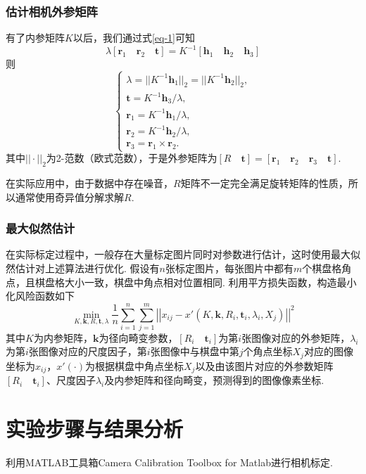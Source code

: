\documentclass[12pt, a4paper, oneside]{ctexart}
\numberwithin{equation}{section}  %
\def\bd{\boldsymbol}        %
\begin{document}
\subsubsection{估计相机外参矩阵}
有了内参矩阵$K$以后，我们通过式\ref{eq-1}可知
\begin{equation*}
    \lambda[\bd{r}_1\quad \bd{r}_2\quad \bd{t}] = K^{-1}[\bd{h}_1\quad \bd{h}_2\quad \bd{h}_3]
\end{equation*}
则
\begin{equation*}
    \begin{cases}
        \lambda = ||K^{-1}\bd{h}_1||_2 = ||K^{-1}\bd{h}_2||_2,\\
        \bd{t} = K^{-1}\bd{h}_3/\lambda,\\
        \bd{r}_1 = K^{-1}\bd{h}_1/\lambda,\\
        \bd{r}_2 = K^{-1}\bd{h}_2/\lambda,\\
        \bd{r}_3=\bd{r}_1\times \bd{r}_2.
    \end{cases}
\end{equation*}
其中$||\cdot||_2$为2-范数（欧式范数），于是外参矩阵为$[R\quad \bd{t}] = [\bd{r}_1\quad \bd{r}_2\quad \bd{r}_3\quad \bd{t}]$.

在实际应用中，由于数据中存在噪音，$R$矩阵不一定完全满足旋转矩阵的性质，所以通常使用奇异值分解求解$R$.

\subsubsection{最大似然估计}
在实际标定过程中，一般存在大量标定图片同时对参数进行估计，这时使用最大似然估计对上述算法进行优化. 假设有$n$张标定图片，每张图片中都有$m$个棋盘格角点，且棋盘格大小一致，棋盘中角点相对位置相同. 利用平方损失函数，构造最小化风险函数如下
\begin{equation*}
    \min_{K,\bd{k},R,\bd{t},\lambda}\frac{1}{n}\sum_{i=1}^n\sum_{j=1}^m\left|\left|x_{ij}-x'(K,\bd{k},R_i,\bd{t}_i,\lambda_i,X_{j})\right|\right|^2
\end{equation*}
其中$K$为内参矩阵，$\bd{k}$为径向畸变参数，$[R_i\quad \bd{t}_i]$为第$i$张图像对应的外参矩阵，$\lambda_i$为第$i$张图像对应的尺度因子，第$i$张图像中与棋盘中第$j$个角点坐标$X_{j}$对应的图像坐标为$x_{ij}$，$x'(\cdot)$为根据棋盘中角点坐标$X_{j}$以及由该图片对应的外参数矩阵$[R_i\quad \bd{t}_i]$、尺度因子$\lambda_i$及内参矩阵和径向畸变，预测得到的图像像素坐标.

\section{实验步骤与结果分析}
利用MATLAB工具箱Camera Calibration Toolbox for Matlab进行相机标定.
\end{document}
